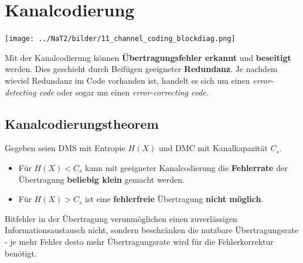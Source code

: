 \section{Kanalcodierung } 
\begin{center}
	\texttt{[image: ../NaT2/bilder/11\_channel\_coding\_blockdiag.png]}
\end{center}

Mit der Kanalcodierung können \textbf{Übertragungsfehler erkannt} und \textbf{beseitigt} werden.
Dies geschieht durch Beifügen geeigneter \textbf{Redundanz}. Je nachdem wieviel Redundanz im Code vorhanden ist, handelt es sich um einen \textit{error-detecting
code} oder sogar um einen \textit{error-correcting code}.

\subsection{Kanalcodierungstheorem }
Gegeben seien DMS mit Entropie $H(X)$ und DMC mit Kanalkapazität $C_s$. 

\begin{itemize}
  	\item Für $H(X) < C_s$ kann mit geeigneter Kanalcodierung die \textbf{Fehlerrate} der
  	Übertragung \textbf{beliebig klein} gemacht werden. 
	\item Für $H(X) > C_s$ ist eine \textbf{fehlerfreie} Übertragung \textbf{nicht möglich}.
\end{itemize}
Bitfehler in der Übertragung verunmöglichen einen zuverlässigen Informationsaustausch nicht,
sondern beschränken die nutzbare Übertragungsrate - je mehr Fehler desto mehr Übertragungsrate
wird für die Fehlerkorrektur benötigt. \\


